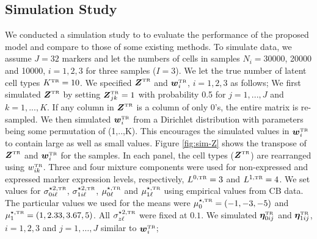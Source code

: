 \documentclass[12pt,]{article}
\def\bet{\bm{\eta}}
\newcommand{\true}{{\mbox{\tiny TR}}}
\newcommand{\bZ}{\mbox{\boldmath $Z$}}
\newcommand{\bw}{\mbox{\boldmath $w$}}
\begin{document}
\subsection{Simulation Study} %
We conducted a simulation study to  to evaluate the performance of the proposed model and compare to those of some existing methods.
%
%
To simulate data, we assume $J=32$ markers and let the numbers of cells in
samples $N_i=30000$, 20000 and 10000, $i=1, 2, 3$ for three samples ($I=3$).
We let the true number of latent cell types $K^\true=10$.  We specified
$\bZ^\true$ and $\bw^\true_i$, $i=1,2,3$ as follows;
%
We first simulated $\bZ^\true$ by setting $\bZ^\true_{jk}=1$ with probability
0.5 for $j=1,...,J$ and $k=1,...,K$. If any column in $\bZ^\true$ is a column
of only 0's, the entire matrix is re-sampled.
We then simulated $\bw^\true_i$ from a Dirichlet distribution with parameters
being some permutation of (1,..,K). This encourages the simulated values
in $\bw^\true_i$ to contain large as well as small values.
%
Figure \ref{fig:sim-Z} shows the transpose of $\bZ^\true$ and $\bw^\true_i$ for
the samples. In each panel, the cell types ($\bZ^\true$) are rearranged using
$w_{ik}^\true$.  Three and four mixture components were used for non-expressed
and expressed marker expression levels, respectively, $L^{0, \true}=3$ and
$L^{1, \true}=4$. We set values for $\sigma^{\star 2, \true}_{0i\ell}$,
$\sigma^{\star 2,\true}_{1i\ell}$, $\mu^{\star, \true}_{0\ell}$ and
$\mu^{\star, \true}_{1\ell}$ using empirical values from CB data.
%
The particular values we used for the means  were $\mu^{\star, \true}_{0} =
(-1, -3, -5)$ and $\mu^{\star, \true}_{1} = (1, 2.33, 3.67, 5)$. All
$\sigma^{\star 2, \true}_{z\ell}$ were fixed at $0.1$.
%
 We simulated $\bet_{0ij}^\true$ and $\bet_{1ij}^\true$, $i=1,2,3$ and $j=1, \ldots, J$ similar to $\bw^\true_i$;
%
\end{document}
